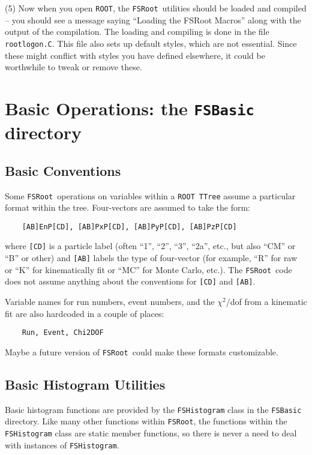 \documentclass[11pt]{article}
\newcommand{\FSR}{{\tt FSRoot}}
\newcommand{\ROOT}{{\tt ROOT}}
\begin{document}
(5) Now when you open \ROOT, the \FSR\ utilities should be loaded and compiled -- you should see a message saying ``Loading the FSRoot Macros'' along with the output of the compilation.  The loading and compiling is done in the file {\tt rootlogon.C}.  This file also sets up default styles, which are not essential.  Since these might conflict with styles you have defined elsewhere, it could be worthwhile to tweak or remove these.

\section{Basic Operations:  the {\tt FSBasic} directory}

\subsection{Basic Conventions}
\label{sec:conventions}

Some \FSR\ operations on variables within a \ROOT\ {\tt TTree} assume a particular format within the tree.  Four-vectors are assumed to take the form:
\begin{verbatim}
    [AB]EnP[CD], [AB]PxP[CD], [AB]PyP[CD], [AB]PzP[CD]
\end{verbatim}
where {\tt [CD]} is a particle label (often ``1'', ``2'', ``3'', ``2a'', etc., but also ``CM'' or ``B'' or other) and {\tt [AB]} labels the type of four-vector (for example, ``R'' for raw or ``K'' for kinematically fit or ``MC'' for Monte Carlo, etc.).  The \FSR\ code does not assume anything about the conventions for {\tt [CD]} and {\tt [AB]}.

Variable names for run numbers, event numbers, and the $\chi^2$/dof from a kinematic fit are also hardcoded in a couple of places:
\begin{verbatim}
    Run, Event, Chi2DOF
\end{verbatim}
Maybe a future version of \FSR\ could make these formats customizable.


\subsection{Basic Histogram Utilities}
\label{sec:hist}

Basic histogram functions are provided by the {\tt FSHistogram} class in the {\tt FSBasic} directory.  Like many other functions within \FSR, the functions within the {\tt FSHistogram} class are static member functions, so there is never a need to deal with instances of {\tt FSHistogram}.
\end{document}
